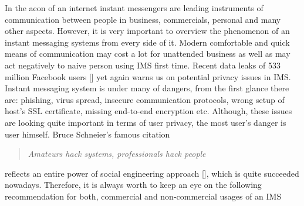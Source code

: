 %

In the aeon of an internet instant messengers are leading instruments of communication between people in business,
commercials, personal and many other aspects.
However, it is very important to overview the phenomenon of an instant messaging systems from every side of it.
Modern comfortable and quick means of communication may cost a lot for unattended business
as well as may act negatively to naive person using IMS first time.
Recent data leaks of 533 million Facebook users [\cite{holmes2021533}]
yet again warns us on potential privacy issues in IMS\@.
Instant messaging system is under many of dangers, from the first glance there are: phishing, virus spread,
insecure communication protocols, wrong setup of host's SSL certificate, missing end-to-end encryption etc.
Although, these issues are looking quite important in terms of user privacy, the most user's danger is user himself.
Bruce Schneier's famous citation
\begin{quote}
    \textit{Amateurs hack systems, professionals hack people}
\end{quote}
reflects an entire power of social engineering approach [\cite{luo2011social}], which is quite succeeded nowadays.
Therefore, it is always worth to keep an eye on the following recommendation for both, commercial and non-commercial
usages of an IMS

